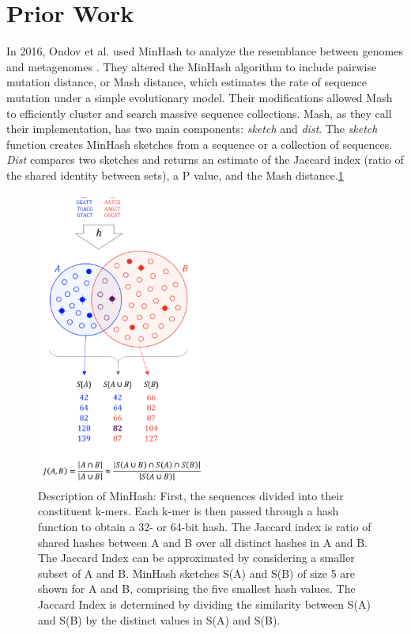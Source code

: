 \documentclass[12pt, letterpaper]{article}
\begin{document}
\section{Prior Work}
In 2016, Ondov et al. used MinHash to analyze the resemblance between genomes and metagenomes \cite{MinHash}. They altered the MinHash algorithm to include pairwise mutation distance, or Mash distance, which estimates the rate of sequence mutation under a simple evolutionary model. Their modifications allowed Mash to efficiently cluster and search massive sequence collections. Mash, as they call their implementation, has two main components: \textit{sketch} and \textit{dist}. The \textit{sketch} function creates MinHash sketches from a sequence or a collection of sequences. \textit{Dist} compares two sketches and returns an estimate of the Jaccard index (ratio of the shared identity between sets), a P value, and the Mash distance.\ref{fig:MinHashDescription}
\begin{figure}[h!]
	\centering
	\includegraphics[width=0.5\textwidth]{Mash_description.png}
	\caption{Description of MinHash: First, the sequences divided into their constituent k-mers. Each k-mer is then passed through a hash function to obtain a 32- or 64-bit hash. The Jaccard index is ratio of shared hashes between A and B over all distinct hashes in A and B. The Jaccard Index can be approximated by considering a smaller subset of A and B. MinHash sketches S(A) and S(B) of size 5 are shown for A and B, comprising the five smallest hash values. The Jaccard Index is determined by dividing the similarity between S(A) and S(B) by the distinct values in S(A) and S(B).}
	\label{fig:MinHashDescription}
\end{figure}
\end{document}
